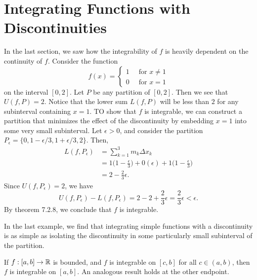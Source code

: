 \section{Integrating Functions with Discontinuities}

In the last section, we saw how the integrability of \( f  \) is heavily dependent on the continuity of \( f  \). 
Consider the function
\[  f(x) = 
\begin{cases}
	1 \ &\text{ for } x \neq 1 \\
	0 \ &\text{ for } x = 1
\end{cases} \] on the interval \( [0,2]  \). Let \( P  \) be any partition of \( [0,2] \). Then we see that \( U(f,P) = 2  \). Notice that the lower sum \( L(f,P ) \) will be less than \( 2  \) for any subinterval containing \( x = 1  \). TO show that \( f  \) is integrable, we can construct a partition that minimizes the effect of the discontinuity by embedding \( x = 1  \) into some very small subinterval.
Let \( \epsilon > 0  \), and consider the partition \( P_{\epsilon } = \{ 0, 1 - \epsilon / 3, 1 + \epsilon / 3, 2  \}. \) Then, 
\begin{align*}
    L(f, P_{\epsilon }) &= \sum_{ k=1 }^{ 3 } m_{k} \Delta x_{k} \\
						&= 1 \Big( 1 - \frac{ \epsilon  }{ 3 }  \Big) + 0(\epsilon ) + 1 \Big( 1 - \frac{ \epsilon  }{ 3 }  \Big) \\
						&= 2 - \frac{ 2 }{ 3 } \epsilon.
\end{align*}
Since \( U(f, P_{\epsilon }) = 2  \), we have 
\[  U(f, P_{\epsilon }) - L(f, P_{\epsilon }) = 2 - 2 +  \frac{ 2  }{ 3  } \epsilon = \frac{  2 }{ 3  } \epsilon < \epsilon. \] By theorem 7.2.8, we conclude that \( f  \) is integrable.

In the last example, we find that integrating simple functions with a discontinuity is as simple as isolating the discontinuity in some particularly small subinterval of the partition. 

\begin{theorem}
	If \( f: [a,b] \to \mathbb{R}  \) is bounded, and \( f  \) is integrable on \( [c,b] \) for all \( c \in (a,b)  \), then \( f  \) is integrable on \( [a,b]  \). An analogous result holds at the other endpoint. 
\end{theorem}

